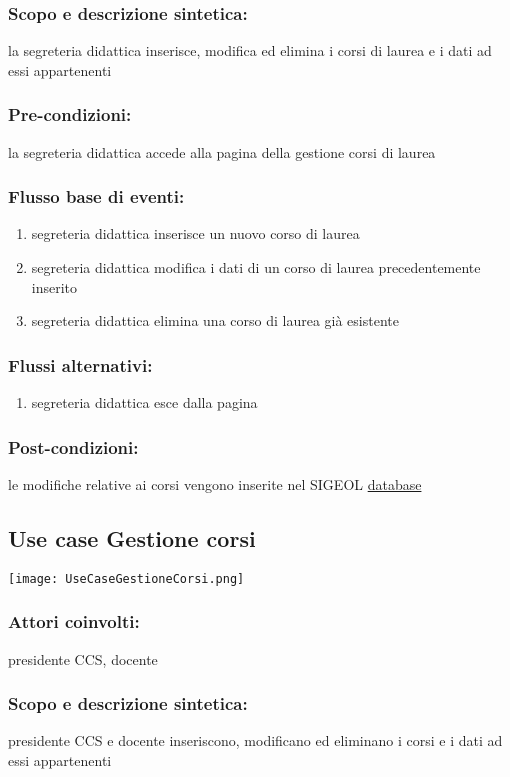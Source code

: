 \documentclass[11pt,a4paper]{article}
\begin{document}
\subsubsection*{Scopo e descrizione sintetica:}
la segreteria didattica inserisce, modifica ed elimina i corsi di laurea e i dati ad essi appartenenti
\subsubsection*{Pre-condizioni:}
la segreteria didattica accede alla pagina della gestione corsi di laurea
\subsubsection*{Flusso base di eventi:}
\begin{enumerate}
 \item segreteria didattica inserisce un nuovo corso di laurea
 \item segreteria didattica modifica i dati di un corso di laurea precedentemente inserito
 \item segreteria didattica elimina una corso di laurea già esistente
\end{enumerate}
\subsubsection*{Flussi alternativi:}
\begin{enumerate} 
\item segreteria didattica esce dalla pagina
\end{enumerate}
\subsubsection*{Post-condizioni:}
le modifiche relative ai corsi vengono inserite nel SIGEOL \underline{database}

\subsection{Use case Gestione corsi}
\begin{center} 
 \texttt{[image: UseCaseGestioneCorsi.png]}
\end{center}
\subsubsection*{Attori coinvolti:}
presidente CCS, docente
\subsubsection*{Scopo e descrizione sintetica:}
presidente CCS e docente inseriscono, modificano ed eliminano i corsi e i dati ad essi appartenenti
\end{document}
